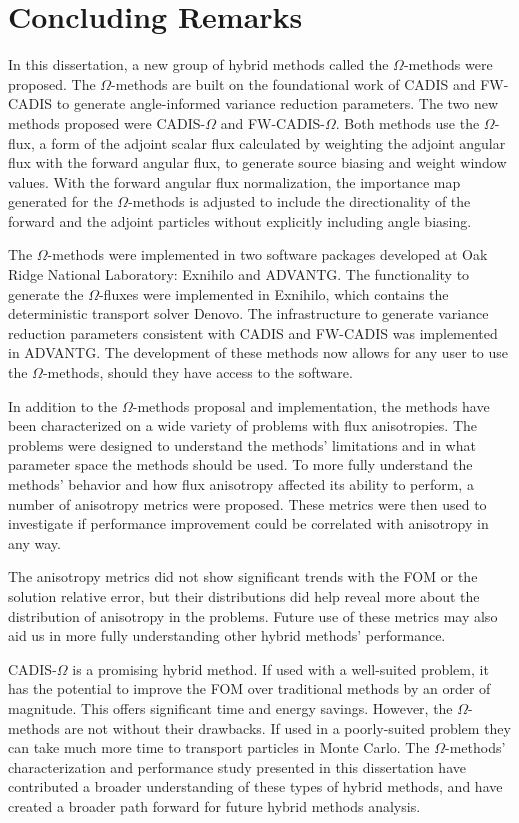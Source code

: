 \section{Concluding Remarks}
\label{sec:concluding-remarks}

In this dissertation, a new group of hybrid methods called the $\Omega$-methods
were
proposed. The $\Omega$-methods are built on the foundational work of CADIS
and FW-CADIS to generate angle-informed variance reduction parameters. The two
new methods proposed were CADIS-$\Omega$ and FW-CADIS-$\Omega$. Both methods use
the $\Omega$-flux, a form of the adjoint scalar flux calculated by weighting
the adjoint angular flux with the forward angular flux, to generate source biasing and weight window
values. With the forward angular flux normalization, the importance map generated for the
$\Omega$-methods is adjusted to include the directionality of
the forward and the adjoint particles without explicitly including angle
biasing.

The $\Omega$-methods were implemented in two software packages developed at Oak
Ridge National Laboratory: Exnihilo and ADVANTG. The functionality to generate
the $\Omega$-fluxes were implemented in Exnihilo, which contains the
deterministic transport solver Denovo. The infrastructure to generate variance
reduction parameters consistent with CADIS and FW-CADIS was implemented in
ADVANTG. The development of these methods now allows for any user to use the
$\Omega$-methods, should they have access to the software.

In addition to the $\Omega$-methods proposal and implementation, the methods have been
characterized on a wide variety of problems with flux anisotropies. The problems
were designed to understand the methods' limitations and in what parameter space
the methods should be used. To more fully understand the methods' behavior and how
flux anisotropy affected its ability to perform, a number of anisotropy metrics
were proposed. These metrics were then used
to investigate if performance improvement could be correlated with
anisotropy in any way.

The anisotropy metrics did not show significant trends with the FOM or the
solution relative error, but their distributions did help reveal more about the
distribution of anisotropy in the problems. Future use of these metrics may also
aid us in more fully understanding other hybrid methods' performance.

CADIS-$\Omega$ is a promising hybrid method. If used with a well-suited problem,
it has the potential to improve the FOM over traditional methods by an order of
magnitude. This offers significant time and energy savings. However, the
$\Omega$-methods are not without their drawbacks. If used in a poorly-suited
problem they can take much more time to transport particles in
Monte Carlo. The $\Omega$-methods' characterization and performance study
presented in this dissertation have contributed a broader understanding of these types of
hybrid methods, and have created a broader path forward for future hybrid
methods analysis.


